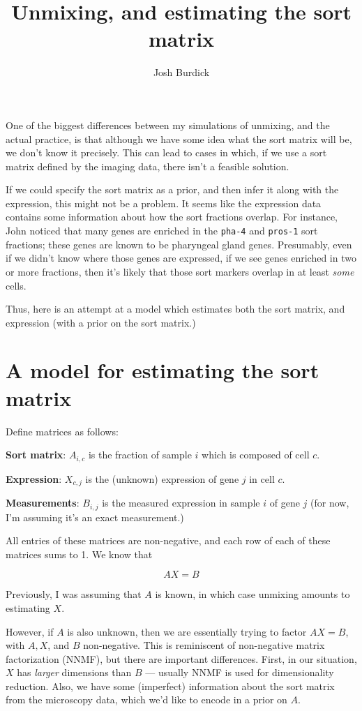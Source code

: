 \documentclass{article}
\title{Unmixing, and estimating the sort matrix}
\author{Josh Burdick}
\begin{document}
\maketitle

One of the biggest differences between my simulations of unmixing, and
the actual practice, is that although we have some idea what the sort
matrix will be, we don't know it precisely. This can lead to cases in
which, if we use a sort matrix defined by the imaging data, there isn't a
feasible solution.

If we could specify the sort matrix as a prior, and then infer it along with
the expression, this might not be a problem. It seems like the expression data
contains some information about how the sort fractions overlap. For instance,
John noticed that many genes are enriched in the {\tt pha-4} and
{\tt pros-1} sort fractions; these genes are known to be pharyngeal gland genes.
Presumably, even if we didn't know where those genes are expressed, if we see
genes enriched in two or more fractions, then it's likely that those sort markers
overlap in at least {\em some} cells.

Thus, here is an attempt at a model which estimates both the sort matrix, and
expression (with a prior on the sort matrix.)

\section{A model for estimating the sort matrix}

Define matrices as follows:

{\bf Sort matrix}: $A_{i,c}$ is the fraction of sample $i$ which is
composed of cell $c$.

{\bf Expression}: $X_{c,j}$ is the (unknown) expression of gene $j$
in cell $c$.

{\bf Measurements}: $B_{i,j}$ is the measured expression in sample $i$
of gene $j$ (for now, I'm assuming it's an exact measurement.)

All entries of these matrices are non-negative, and
each row of each of these matrices sums to 1. We know that 

\[
AX = B
\]

Previously, I was assuming that $A$ is known, in which case unmixing amounts
to estimating $X$.

However,
if $A$ is also unknown, then we are essentially trying to factor
$AX=B$, with $A, X$, and $B$ non-negative. This is reminiscent of non-negative matrix factorization (NNMF), but
there are important differences. First, in our situation,
$X$ has {\em larger} dimensions than $B$ --- usually NNMF is used for dimensionality
reduction. Also, we have some
(imperfect) information about the sort matrix
from the microscopy data, which we'd like to encode in 
a prior on $A$.
\end{document}
